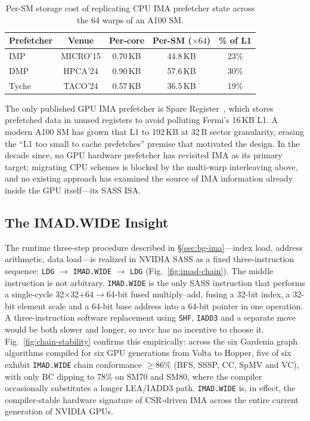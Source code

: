 \documentclass[sigconf, screen, review]{acmart}
\begin{document}
\begin{table}[!b]
  \caption{Per-SM storage cost of replicating CPU IMA prefetcher
    state across the 64 warps of an A100 SM.}
  \label{tab:cpu-cost}
  \centering
  \small
  \begin{tabular}{lcccc}
    \toprule
    Prefetcher & Venue    & Per-core & Per-SM ($\times 64$) & \% of L1 \\
    \midrule
    IMP~\cite{yu2015imp}      & MICRO'15 & 0.70\,KB & 44.8\,KB & 23\% \\
    DMP~\cite{fu2024dmp}      & HPCA'24  & 0.90\,KB & 57.6\,KB & 30\% \\
    Tyche~\cite{xue2024tyche} & TACO'24  & 0.57\,KB & 36.5\,KB & 19\% \\
    \bottomrule
  \end{tabular}
\end{table}

The only published GPU IMA prefetcher is Spare
Register~\cite{lakshminarayana2014spare}, which stores prefetched
data in unused registers to avoid polluting Fermi's 16\,KB L1. A
modern A100 SM has grown that L1 to 192\,KB at 32\,B sector
granularity, erasing the ``L1 too small to cache prefetches''
premise that motivated the design. In the decade since, no GPU
hardware prefetcher has revisited IMA as its primary target;
migrating CPU schemes is blocked by the multi-warp interleaving
above, and no existing approach has examined the source of IMA
information already inside the GPU itself---its SASS ISA.

\subsection{The IMAD.WIDE Insight}
\label{sec:bg-imad}

The runtime three-step procedure described in
\S\ref{sec:bg-ima}---index load, address arithmetic, data load---is
realized in NVIDIA SASS as a fixed three-instruction sequence:
\texttt{LDG} $\to$ \texttt{IMAD.WIDE} $\to$ \texttt{LDG}
(Fig.~\ref{fig:imad-chain}).
The middle instruction is not arbitrary.
\texttt{IMAD.WIDE} is the only SASS instruction that performs a
single-cycle 32$\times$32$+$64$\to$64-bit fused multiply--add,
fusing a 32-bit index, a 32-bit element scale and a 64-bit base
address into a 64-bit pointer in one operation.
A three-instruction software replacement using \texttt{SHF},
\texttt{IADD3} and a separate move would be both slower and longer,
so nvcc has no incentive to choose it.
Fig.~\ref{fig:chain-stability} confirms this empirically:
across the six Gardenia graph algorithms compiled for six GPU
generations from Volta to Hopper, five of six exhibit
\texttt{IMAD.WIDE} chain conformance $\geq{}86\%$ (BFS, SSSP, CC,
SpMV and VC), with only BC dipping to 78\% on SM70 and SM80, where
the compiler occasionally substitutes a longer LEA/IADD3 path.
\texttt{IMAD.WIDE} is, in effect, the compiler-stable hardware
signature of CSR-driven IMA across the entire current generation
of NVIDIA GPUs.
\end{document}
